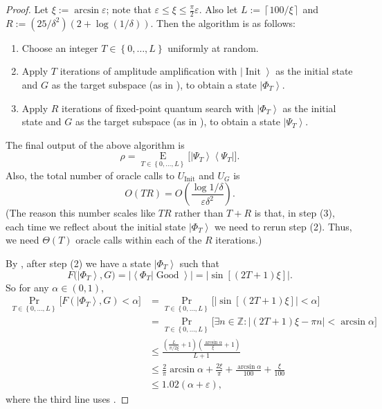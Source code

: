 \begin{proof}
Let $\xi:=\arcsin\varepsilon$; note that $\varepsilon\leq\xi\leq\frac{\pi}%
{2}\varepsilon$. Also let $L:=\left\lceil 100/\xi\right\rceil $ and
$R:=({25}/{\delta^{2}})\left(  2+\log({1}/{\delta})\right)  $. Then the
algorithm is as follows:

\begin{enumerate}
\item[(1)] Choose an integer $T\in\left\{  0,\ldots,L\right\}  $ uniformly at random.

\item[(2)] Apply $T$ iterations of amplitude amplification with $\left\vert
\operatorname*{Init}\right\rangle $ as the initial state and $G$ as the
target subspace (as in ), to obtain a state $\left\vert \Phi
_{T}\right\rangle $.

\item[(3)] Apply $R$ iterations of fixed-point quantum search with
$\left\vert \Phi_{T}\right\rangle $ as the initial state and $G$ as the
target subspace (as in ), to obtain a state $\left\vert
\Psi_{T}\right\rangle $.
\end{enumerate}

The final output of the above algorithm is
\[
\rho=\operatorname*{E}_{T\in\left\{  0,\ldots,L\right\}  }\bigl[  \left\vert
\Psi_{T}\right\rangle \left\langle \Psi_{T}\right\vert \bigr]  .
\]
Also, the total number of oracle calls to $U_{\operatorname*{Init}}$ and
$U_{G}$ is%
\[
O\left(  TR\right)  =O\left(  \frac{\log1/\delta}{\varepsilon\delta^{2}%
}\right)  .
\]
(The reason this number scales like $TR$ rather than $T+R$ is that, in step
(3), each time we reflect about the initial state $\left\vert \Phi
_{T}\right\rangle $ we need to rerun step (2). Thus, we need $\Theta\left(
T\right)  $ oracle calls within each of the $R$ iterations.)

By , after step (2) we have a state $\left\vert \Phi
_{T}\right\rangle $ such that
\[
F\bigl(  \left\vert \Phi_{T}\right\rangle ,G\bigr)  =\bigl\vert \left\langle
\Phi_{T}|\operatorname*{Good}\right\rangle \bigr\vert =\bigl\vert \sin\left[
\left(  2T+1\right)  \xi\right]  \bigr\vert .
\]
So for any $\alpha\in\left(  0,1\right)  $,%
\begin{align*}
\Pr_{T\in\left\{  0,\ldots,L\right\}  }\bigl[  F\left(  \left\vert \Phi
_{T}\right\rangle ,G\right)  <\alpha\bigr]   &  =\Pr_{T\in\left\{
0,\ldots,L\right\}  }\bigl[  \left\vert \sin\left[  \left(  2T+1\right)
\xi\right]  \right\vert <\alpha\bigr]  \\
&  =\Pr_{T\in\left\{  0,\ldots,L\right\}  }\bigl[  \exists n\in\mathbb{Z}%
:\left\vert \left(  2T+1\right)  \xi-\pi n\right\vert <\arcsin\alpha\bigr]
\\
&  \leq\frac{\left(  \frac{L}{\pi/2\xi}+1\right)  \left(  \frac{\arcsin\alpha
}{\xi}+1\right)  }{L+1}\\
&  \leq\frac{2}{\pi}\arcsin\alpha+\frac{2\xi}{\pi}+\frac{\arcsin\alpha}%
{100}+\frac{\xi}{100}\\[1ex]
&  \leq1.02\left(  \alpha+\varepsilon\right)  ,
\end{align*}
where the third line uses .


\end{proof}
